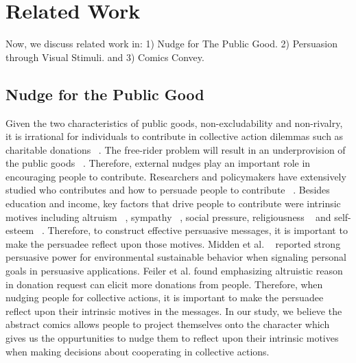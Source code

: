 \section{Related Work}
\label{sec:relatedwork}
Now, we discuss related work in: 1) Nudge for The Public Good. 2) Persuasion through Visual Stimuli. and 3) Comics Convey.

\subsection{Nudge for the Public Good}

Given the two characteristics of public goods, non-excludability and non-rivalry, it is irrational for individuals to contribute in collective action dilemmas such as charitable donations ~\cite{MarwellandAmes1981}. The free-rider problem will result in an underprovision of the public goods ~\cite{}. Therefore, external nudges play an important role in encouraging people to contribute. Researchers and policymakers have extensively studied who contributes and how to persuade people to contribute ~\cite{}. Besides education and income, key factors that drive people to contribute were intrinsic motives including altruism ~\cite{Olson1965}, sympathy ~\cite{Becker1974}, social pressure, religiousness ~\cite{Pessemier1977} and self-esteem ~\cite{Burnett1981}. Therefore, to construct effective persuasive messages, it is important to make the persuadee reflect upon those motives.  Midden et al. ~\cite{} reported strong persuasive power for environmental sustainable behavior when signaling personal goals in persuasive applications. Feiler et al. found emphasizing altruistic reason in donation request can elicit more donations from people. Therefore, when nudging people for collective actions, it is important to make the persuadee reflect upon their intrinsic motives in the messages. In our study, we believe the abstract comics allows people to project themselves onto the character which gives us the oppurtunities to nudge them to reflect upon their intrinsic motives when making decisions about cooperating in collective actions. 

